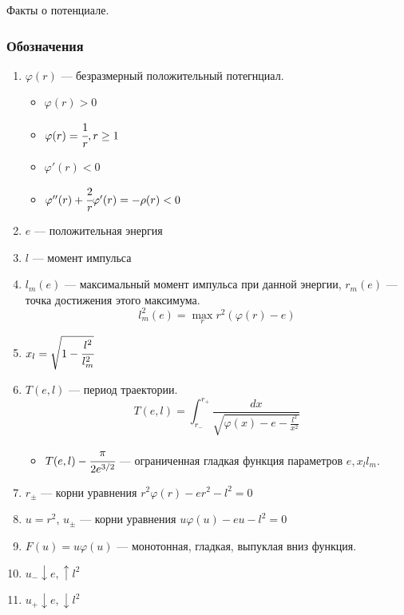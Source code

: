


	Факты о потенциале.
	\subsubsection{Обозначения}
	\begin{enumerate}
		\item $\varphi(r)$ --- безразмерный положительный потегнциал.
		\begin{itemize}
			\item $\varphi(r) > 0$
			\item $\varphi(r) = \cfrac{1}{r}, r \ge 1$
			\item $\varphi'(r) < 0$
			\item $\varphi''(r) + \cfrac{2}{r}\varphi'(r) = -\rho(r) < 0$
		\end{itemize}
		\item $e$ --- положительная энергия
		\item $l$ --- момент импульса
		\item $l_m(e)$ --- максимальный момент импульса при данной энергии, $r_m(e)$ --- точка достижения этого максимума.
		\begin{equation}
			l^2_m(e) = \max_r{r^2(\varphi(r)-e)}
			\label{eq:l_m_e}
		\end{equation}
		\item $x_l = \sqrt{1 - \cfrac{l^2}{l_m^2}}$
		\item $T(e,l)$ --- период траектории.
		\begin{equation*}
			T(e,l) = \int_{r_{-}}^{r_{+}}\frac{dx}{ \sqrt{\varphi(x) -e - \frac{l^{2}}{x^{2}}}}
		\end{equation*}
		\begin{itemize}
			\item $T(e,l) - \cfrac{\pi}{2e^{3/2}}$ --- ограниченная гладкая функция параметров $e, x_l l_m$.
		\end{itemize}
		\item $r_{\pm}$ --- корни уравнения $r^2\varphi(r)-er^2-l^2=0$
		\item $u = r^2$, $u_{\pm}$ --- корни уравнения  $u\varphi(u)-eu-l^2=0$
		\item $F(u) = u\varphi(u)$ --- монотонная, гладкая, выпуклая вниз функция.
		\item $u_{-} \downarrow e, \uparrow l^2$
		\item $u_{+} \downarrow e, \downarrow l^2$
	\end{enumerate}
	
